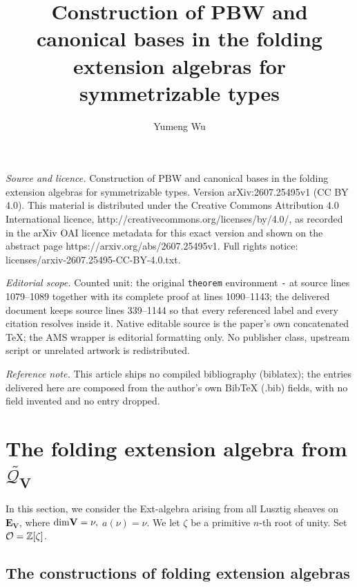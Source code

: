 \documentclass[10pt,a4paper]{amsart}
\def\dim{\mbox{\rm dim}}   \def\End{\mbox{\rm End}}
\def\bfV{{\mathbf V}}
\def\bfV{\mathbf{V}}
\newcommand\mo{{\mathcal{O}}}
\newcommand\mq{{\mathcal{Q}}}
\begin{document}
\title[Construction of PBW and canonical bases in the folding exten]{Construction of PBW and canonical bases in the folding extension algebras for symmetrizable types}
\author{Yumeng Wu}
\date{}
\maketitle
\noindent\emph{Source and licence.} Construction of PBW and canonical bases in the folding extension algebras for symmetrizable types. Version arXiv:2607.25495v1 (CC BY 4.0). This material is distributed under the Creative Commons Attribution 4.0 International licence, http://creativecommons.org/licenses/by/4.0/, as recorded in the arXiv OAI licence metadata for this exact version and shown on the abstract page https://arxiv.org/abs/2607.25495v1. Full rights notice: licenses/arxiv-2607.25495-CC-BY-4.0.txt.\par\smallskip
\noindent\textit{Editorial scope.} Counted unit: the original \texttt{theorem} environment \texttt{-} at source lines 1079--1089 together with its complete proof at lines 1090--1143; the delivered document keeps source lines 339--1144 so that every referenced label and every citation resolves inside it. Native editable source is the paper's own concatenated TeX; the AMS wrapper is editorial formatting only. No publisher class, upstream script or unrelated artwork is redistributed.
\par\smallskip\noindent\textit{Reference note.} This article ships no compiled bibliography (biblatex); the entries delivered here are composed from the author's own BibTeX (.bib) fields, with no field invented and no entry dropped.
\section{The folding extension algebra from $\widetilde{\mq_{\bfV}}$}
In this section, we consider the Ext-algebra arising from all Lusztig sheaves on $\mathbf{E}_{\mathbf{V}}$, where $\dim \mathbf{V} = \nu,$ $a(\nu)=\nu.$ We let $\zeta$ be a primitive $n$-th root of unity. Set $\mo=\bbZ[\zeta]$.
\subsection{The constructions of folding extension algebras}
\end{document}
